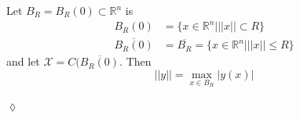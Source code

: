 \begin{example}
Let $B_R=B_R(0)\subset\mathbb{R}^n$ is
\begin{align*}
B_R(0) &= \{x\in\mathbb{R}^n | ||x||\subset R\} \\
\overline{B_R(0)} &= \overline{B_R} = \{x\in\mathbb{R}^n | ||x||\leq R\}
\end{align*}
and let $\mathcal{X}=C(\overline{B_R(0)}$. Then
$$||y||=\max_{x\in B_R} |y(x)|$$
\end{example}
$\lozenge$


